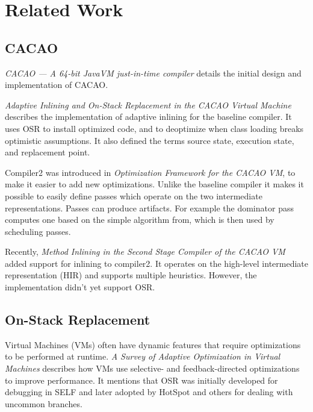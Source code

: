 \documentclass[draft,final]{vutinfth} %
\begin{document}
    \chapter{Related Work}


    \section{CACAO}

    \textit{{CACAO} — A 64-bit {JavaVM} just-in-time compiler}\cite{cacao-64bit-jit} details the initial design and implementation of CACAO.

    \textit{Adaptive Inlining and On-Stack Replacement in the CACAO Virtual Machine}\cite{10.1145/1294325.1294356}
    describes the implementation of adaptive inlining for the baseline compiler.
    It uses OSR to install optimized code,
    and to deoptimize when class loading breaks optimistic assumptions.
    It also defined the terms source state,
    execution state, and replacement point.

    Compiler2 was introduced in \textit{Optimization Framework for the CACAO VM}\cite{EislJosef2013Offt},
    to make it easier to add new optimizations.
    Unlike the baseline compiler it makes it possible to easily define passes
    which operate on the two intermediate representations.
    Passes can produce artifacts.
    For example the dominator pass computes one based on the simple algorithm from\cite{dominators},
    which is then used by scheduling passes.

    Recently,
    \textit{Method Inlining in the Second Stage Compiler of the CACAO VM}\cite{MethodInlining}
    added support for inlining to compiler2.
    It operates on the high-level intermediate representation (HIR) and supports multiple heuristics.
    However, the implementation didn't yet support OSR.

    \section{On-Stack Replacement}

    Virtual Machines (VMs) often have dynamic features
    that require optimizations to be performed at runtime.
    \textit{A Survey of Adaptive Optimization in Virtual Machines}\cite{AdapOptSurvey}
    describes how VMs use selective- and feedback-directed optimizations
    to improve performance.
    It mentions that OSR was initially developed
    for debugging in SELF\cite{10.1145/191081.191116}
    and later adopted by HotSpot\cite{hotspot} and others
    for dealing with uncommon branches.
\end{document}
